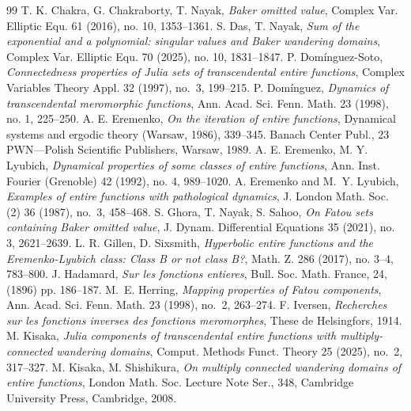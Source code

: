 \documentclass[11pt,a4paper]{article}
\begin{document}
\begin{thebibliography}{99}
	T. K. Chakra,  G. Chakraborty, T. Nayak,  \emph{Baker omitted value}, Complex Var. Elliptic Equ. 61 (2016), no. 10, 1353–1361.
	S. Das, T. Nayak, \emph{Sum of the exponential and a polynomial:
		singular values and Baker wandering
		domains}, Complex Var. Elliptic Equ. 70 (2025), no. 10, 1831–1847.
		P. Dom\'inguez-Soto, \emph{Connectedness properties of Julia sets of transcendental entire functions},  Complex Variables Theory Appl. {  32} (1997), no.~3, 199--215.
	P. Dom\'inguez, \emph{Dynamics of transcendental meromorphic functions}, Ann. Acad. Sci. Fenn. Math. 23 (1998), no. 1, 225–250.
	A. E. Eremenko, \emph{On the iteration of entire functions}, Dynamical systems and ergodic theory (Warsaw, 1986), 339–345.
	Banach Center Publ., 23
	PWN—Polish Scientific Publishers, Warsaw, 1989.
	A. E. Eremenko, M. Y. Lyubich, \emph{Dynamical properties of some classes of entire functions}, Ann. Inst. Fourier (Grenoble)
	42 (1992), no. 4, 989–1020.  
	A. Eremenko and M.~Y. Lyubich, \emph{Examples of entire functions with pathological dynamics}, J. London Math. Soc. (2) 36 (1987), no.~3, 458--468.
	S. Ghora,  T. Nayak, S.  Sahoo,  \emph{On Fatou sets containing Baker omitted value}, J. Dynam. Differential Equations 35 (2021), no. 3, 2621–2639.
	L. R. Gillen, D. Sixsmith,  \emph{Hyperbolic entire functions and the Eremenko-Lyubich class:
		Class B or not class B?}, Math. Z. 286 (2017), no. 3–4, 783–800.
	J. Hadamard, \emph{Sur les fonctions entieres}, Bull. Soc. Math. France, 24, (1896) pp. 186–187.
	M.~E. Herring, \emph{Mapping properties of Fatou components}, Ann. Acad. Sci. Fenn. Math. { 23} (1998), no.~2, 263--274.
	F. Iversen, \emph{Recherches sur les fonctions inverses des fonctions meromorphes}, These de Helsingfors, 1914.
	M. Kisaka, \emph{Julia components of transcendental entire functions with multiply-connected wandering domains}, Comput. Methods Funct. Theory {  25} (2025), no.~2, 317--327.
	M. Kisaka, M. Shishikura, \emph{On multiply connected wandering domains of entire functions}, London Math. Soc. Lecture Note Ser., 348, Cambridge University Press, Cambridge, 2008.
	

\end{thebibliography}
\end{document}
